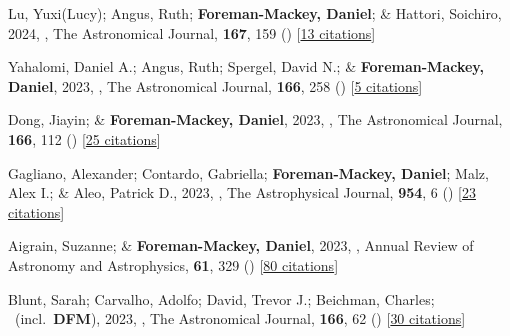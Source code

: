 \item[{\color{numcolor}\scriptsize101}] Lu, Yuxi(Lucy); Angus, Ruth; \textbf{Foreman-Mackey, Daniel}; \& Hattori, Soichiro, 2024, , The Astronomical Journal, \textbf{167}, 159 () [\href{https://ui.adsabs.harvard.edu/abs/2024AJ....167..159L}{13 citations}]

\item[{\color{numcolor}\scriptsize100}] Yahalomi, Daniel A.; Angus, Ruth; Spergel, David N.; \& \textbf{Foreman-Mackey, Daniel}, 2023, , The Astronomical Journal, \textbf{166}, 258 () [\href{https://ui.adsabs.harvard.edu/abs/2023AJ....166..258Y}{5 citations}]

\item[{\color{numcolor}\scriptsize99}] Dong, Jiayin; \& \textbf{Foreman-Mackey, Daniel}, 2023, , The Astronomical Journal, \textbf{166}, 112 () [\href{https://ui.adsabs.harvard.edu/abs/2023AJ....166..112D}{25 citations}]

\item[{\color{numcolor}\scriptsize98}] Gagliano, Alexander; Contardo, Gabriella; \textbf{Foreman-Mackey, Daniel}; Malz, Alex I.; \& Aleo, Patrick D., 2023, , The Astrophysical Journal, \textbf{954}, 6 () [\href{https://ui.adsabs.harvard.edu/abs/2023ApJ...954....6G}{23 citations}]

\item[{\color{numcolor}\scriptsize97}] Aigrain, Suzanne; \& \textbf{Foreman-Mackey, Daniel}, 2023, , Annual Review of Astronomy and Astrophysics, \textbf{61}, 329 () [\href{https://ui.adsabs.harvard.edu/abs/2023ARA&A..61..329A}{80 citations}]

\item[{\color{numcolor}\scriptsize96}] Blunt, Sarah; Carvalho, Adolfo; David, Trevor J.; Beichman, Charles; \etal\ (incl.\ \textbf{DFM}), 2023, , The Astronomical Journal, \textbf{166}, 62 () [\href{https://ui.adsabs.harvard.edu/abs/2023AJ....166...62B}{30 citations}]

